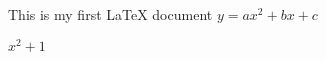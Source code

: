 \documentclass[11pt]{article}
\begin{document}
This is my first LaTeX document
$y=ax^2+bx+c$


$x^2+1$
\end{document}
